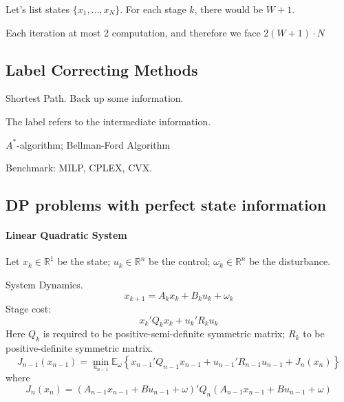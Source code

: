 Let's list states $\{x_1,\dots,x_N\}$. For each stage $k$, there would be $W+1$.

Each iteration at most $2$ computation, and therefore we face $2(W+1)\cdot N$

\subsection{Label Correcting Methods}
Shortest Path. Back up some information.

The label refers to the intermediate information.

$A^*$-algorithm; Bellman-Ford Algorithm

Benchmark: MILP, CPLEX, CVX.

\subsection{DP problems with perfect state information}

\paragraph{Linear Quadratic System}
Let $x_k\in\mathbb{R}^1$ be the state; $u_k\in\mathbb{R}^n$ be the control; $\omega_k\in\mathbb{R}^n$ be the disturbance.

System Dynamics.
\[
x_{k+1}=A_kx_k+B_ku_k+\omega_k
\]
Stage cost:
\[
x_k'Q_kx_k+u_k'R_ku_k
\]
Here $Q_k$ is required to be positive-semi-definite symmetric matrix; $R_k$ to be positive-definite symmetric matrix.
\[
J_{n-1}(x_{n-1})=\min_{u_{n-1}}\mathbb{E}_{\omega}
\left\{
x_{n-1}'Q_{n-1}x_{n-1}+u_{n-1}'R_{n-1}u_{n-1}
+
J_n(x_n)
\right\}
\]
where
\[
J_n(x_n)=(A_{n-1}x_{n-1}+Bu_{n-1}+\omega)'Q_n
(A_{n-1}x_{n-1}+Bu_{n-1}+\omega)
\]













